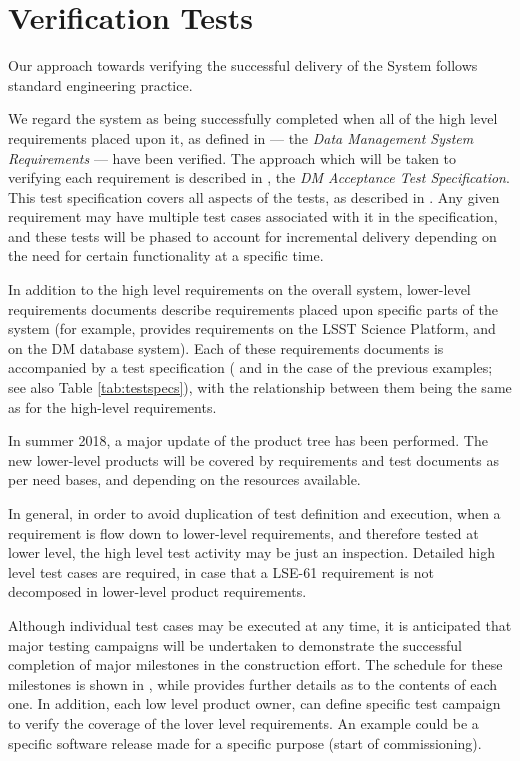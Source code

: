 \section{Verification Tests \label{sect:approach}}

Our approach towards verifying the successful delivery of the \product{} System follows standard engineering practice.

We regard the system as being successfully completed when all of the high level requirements placed upon it, as defined in  --- the \emph{Data Management System Requirements} --- have been verified.
The approach which will be taken to verifying each requirement is described in , the \emph{DM Acceptance Test Specification}.
This test specification covers all aspects of the tests, as described in .
Any given requirement may have multiple test cases associated with it in the specification, and these tests will be phased to account for incremental delivery depending on the need for certain functionality at a specific time.

In addition to the high level requirements on the overall \product{} system, lower-level requirements documents describe requirements placed upon specific parts of the system (for example,  provides requirements on the LSST Science Platform, and  on the DM database system).
Each of these requirements documents is accompanied by a test specification ( and  in the case of the previous examples; see also Table \ref{tab:testspecs}), with the relationship between them being the same as for the high-level requirements.

In summer 2018, a major update of the \product{} product tree has been performed. The new lower-level products will be covered by requirements and test documents as per need bases, and depending on the resources available.

In general, in order to avoid duplication of test definition and execution, when a requirement is flow down to lower-level requirements, and therefore tested at lower level, the high level test activity may be just an inspection.
Detailed high level test cases are required, in case that a LSE-61 requirement is not decomposed in lower-level product requirements.

Although individual test cases may be executed at any time, it is anticipated that major testing campaigns will be undertaken to demonstrate the successful completion of major milestones in the \product{} construction effort.
The schedule for these milestones is shown in , while  provides further details as to the contents of each one.
In addition, each low level product owner, can define specific test campaign to verify the coverage of the lover level requirements.
An example could be a specific software release made for a specific purpose (start of commissioning).

